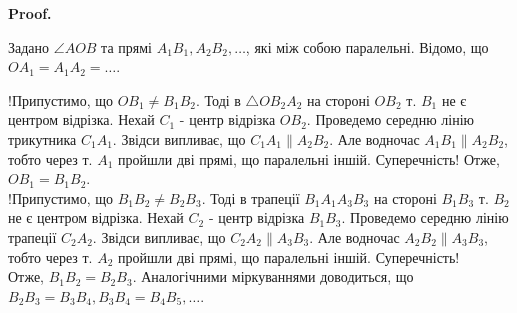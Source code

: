 \documentclass[a4paper, 10pt]{article}
\makeatletter
\def\qed{$\blacksquare$}
\theoremstyle{theoremdd}
\theoremstyle{theoremdd}
\theoremstyle{theoremdd}
\theoremstyle{theoremdd}
\theoremstyle{theoremdd}
\theoremstyle{theoremdd}
\theoremstyle{theoremdd}
\theoremstyle{theoremdd}
\theoremstyle{theoremdd}
\renewenvironment{proof}[1][Proof.\\]{\par
\pushQED{\hfill \qed}%
\normalfont \topsep6\p@\@plus6\p@\relax
\trivlist
\item\relax
{\bfseries
#1\@addpunct{.}}\hspace\labelsep\ignorespaces
}{%
\popQED\endtrivlist\@endpefalse
}
\makeatother
\begin{document}
\begin{proof}
Задано $\angle AOB$ та прямі $A_1B_1,A_2B_2,\dots$, які між собою паралельні. Відомо, що \\ $OA_1 = A_1A_2 = \dots$.
\begin{figure}[H]
\centering
{}
\end{figure}
!Припустимо, що $OB_1 \neq B_1B_2$. Тоді в $\triangle OB_2A_2$ на стороні $OB_2$ т. $B_1$ не є центром відрізка. Нехай $C_1$ - центр відрізка $OB_2$. Проведемо середню лінію трикутника $C_1A_1$. Звідси випливає, що $C_1A_1 \parallel A_2B_2$. Але водночас $A_1B_1 \parallel A_2B_2$, тобто через т. $A_1$ пройшли дві прямі, що паралельні іншій. Суперечність!
Отже, $OB_1 = B_1B_2$.
\bigskip \\
!Припустимо, що $B_1B_2 \neq B_2B_3$. Тоді в трапеції $B_1A_1A_3B_3$ на стороні $B_1B_3$ т. $B_2$ не є центром відрізка. Нехай $C_2$ - центр відрізка $B_1B_3$. Проведемо середню лінію трапеції $C_2A_2$. Звідси випливає, що $C_2A_2 \parallel A_3B_3$. Але водночас $A_2B_2 \parallel A_3B_3$, тобто через т. $A_2$ пройшли дві прямі, що паралельні іншій. Суперечність!\\
Отже, $B_1B_2 = B_2B_3$. Аналогічними міркуваннями доводиться, що $B_2B_3 = B_3B_4, B_3B_4 = B_4B_5,\dots$.
\end{proof}
\end{document}
